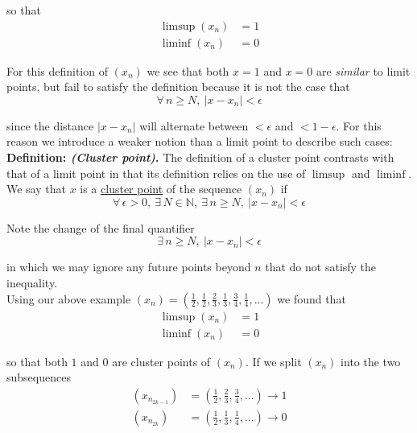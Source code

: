 \documentclass[12pt]{article}
\newlength\tindent
\renewcommand{\indent}{\hspace*{\tindent}}
\newcommand{\N}{\mathbb N}
\begin{document}
so that
\begin{align*}
	\limsup (x_n) &= 1 \\
	\liminf (x_n) &= 0
\end{align*}

\indent For this definition of $(x_n)$ we see that both $x = 1$ and $x = 0$ are {\em similar} to limit points, but fail to satisfy the definition because it is not the case that
\begin{equation*}
	\forall\,n\geq N,~|x - x_n| < \epsilon
\end{equation*}

since the distance $|x - x_n|$ will alternate between $<\epsilon$ and $<1 - \epsilon$. For this reason we introduce a weaker notion than a limit point to describe such cases: \\

%
% 
{\bf Definition: {\em (Cluster point)}.} The definition of a cluster point contrasts with that of a limit point in that its definition relies on the use of $\limsup$ and $\liminf$. We say that $x$ is a \underline{cluster point} of the sequence $(x_n)$ if
\begin{equation*}
	\forall\,\epsilon > 0,~\exists\,N\in\N,~\exists\,n\geq N,~ |x - x_n| < \epsilon
\end{equation*}

Note the change of the final quantifier
\begin{equation*}
	\exists\,n\geq N,~ |x - x_n| < \epsilon
\end{equation*}

in which we may ignore any future points beyond $n$ that do not satisfy the inequality. \\

Using our above example $(x_n) = \left( \frac{1}{2}, \frac{1}{2}, \frac{2}{3}, \frac{1}{3}, \frac{3}{4}, \frac{1}{4}, ... \right)$ we found that
\begin{align*}
	\limsup (x_n) &= 1 \\
	\liminf (x_n) &= 0
\end{align*}

so that both $1$ and $0$ are cluster points of $(x_n)$. If we split $(x_n)$ into the two subsequences
\begin{align*}
	\left( x_{n_{2k - 1}} \right) &= \left( \frac{1}{2}, \frac{2}{3}, \frac{3}{4}, ... \right) \to 1 \\
	\left( x_{n_{2k}} \right) &= \left( \frac{1}{2}, \frac{1}{3}, \frac{1}{4}, ... \right) \to 0
\end{align*}
\end{document}

